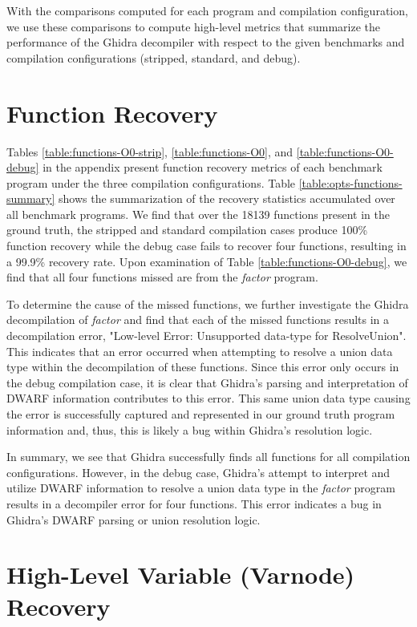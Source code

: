 With the comparisons computed for each program and compilation configuration, we use these comparisons to compute high-level metrics that summarize the performance of the Ghidra decompiler with respect to the given benchmarks and compilation configurations (stripped, standard, and debug).

\section{Function Recovery}



Tables \ref{table:functions-O0-strip}, \ref{table:functions-O0}, and \ref{table:functions-O0-debug} in the appendix present function recovery metrics of each benchmark program under the three compilation configurations. Table \ref{table:opts-functions-summary} shows the summarization of the recovery statistics accumulated over all benchmark programs. We find that over the 18139 functions present in the ground truth, the stripped and standard compilation cases produce 100\% function recovery while the debug case fails to recover four functions, resulting in a 99.9\% recovery rate. Upon examination of Table \ref{table:functions-O0-debug}, we find that all four functions missed are from the \emph{factor} program.

To determine the cause of the missed functions, we further investigate the Ghidra decompilation of \emph{factor} and find that each of the missed functions results in a decompilation error, "Low-level Error: Unsupported data-type for ResolveUnion". This indicates that an error occurred when attempting to resolve a union data type within the decompilation of these functions. Since this error only occurs in the debug compilation case, it is clear that Ghidra's parsing and interpretation of DWARF information contributes to this error. This same union data type causing the error is successfully captured and represented in our ground truth program information and, thus, this is likely a bug within Ghidra's resolution logic.

In summary, we see that Ghidra successfully finds all functions for all compilation configurations. However, in the debug case, Ghidra's attempt to interpret and utilize DWARF information to resolve a union data type in the \emph{factor} program results in a decompiler error for four functions. This error indicates a bug in Ghidra's DWARF parsing or union resolution logic.

\section{High-Level Variable (Varnode) Recovery}

